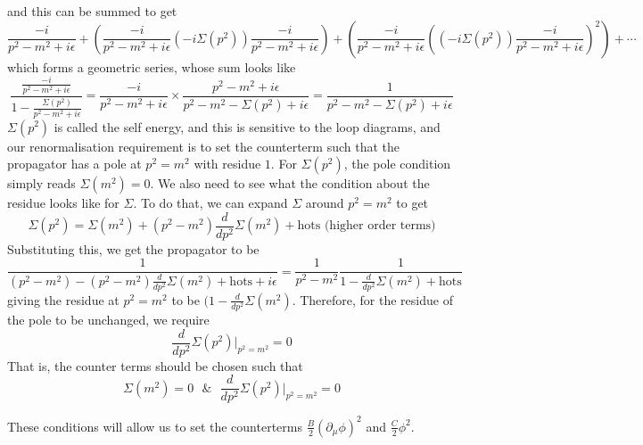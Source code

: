 \documentclass[11pt]{article}
\newcommand{\del}{\partial}
\numberwithin{equation}{section}
\begin{document}
and this can be summed to get 
\begin{equation*}
    \frac{-i}{p^2 - m^2 + i\epsilon} + \left( \frac{-i}{p^2 - m^2 + i\epsilon}(-i\Sigma(p^2))\frac{-i}{p^2 - m^2 + i\epsilon}\right) + \left(\frac{-i}{p^2 - m^2 + i\epsilon}\left((-i\Sigma(p^2))\frac{-i}{p^2 - m^2 + i\epsilon}\right)^2 \right) + \cdots
\end{equation*}
which forms a geometric series, whose sum looks like 
\begin{equation*}
    \displaystyle \frac{\displaystyle \frac{-i}{p^2 - m^2 + i\epsilon}}{\displaystyle 1 - \frac{\Sigma(p^2)}{p^2 - m^2 + i\epsilon}} = \frac{-i}{p^2 - m^2 + i\epsilon} \times \frac{p^2 - m^2 + i\epsilon}{p^2 - m^2 - \Sigma(p^2) + i\epsilon} = \frac{1}{p^2 - m^2 - \Sigma(p^2) + i\epsilon}
\end{equation*}
\(\Sigma(p^2)\) is called the self energy, and this is sensitive to the loop diagrams, and our renormalisation requirement is to set the counterterm such that the propagator has a pole at \(p^2 = m^2\) with residue \(1\). For \(\Sigma(p^2)\), the pole condition simply reads \(\Sigma(m^2) = 0\). We also need to see what the condition about the residue looks like for \(\Sigma\). To do that, we can expand \(\Sigma\) around \(p^2 = m^2\) to get  
\begin{equation*}
    \Sigma(p^2) = \Sigma(m^2) + (p^2 - m^2)\frac{d}{dp^2}\Sigma(m^2) + \text{hots (higher order terms)}
\end{equation*}
Substituting this, we get the propagator to be
\begin{equation*}
    \frac{1}{\displaystyle(p^2 - m^2) - (p^2 - m^2)\frac{d}{dp^2}\Sigma(m^2) + \text{hots} + i\epsilon} = \frac{1}{p^2 - m^2}\frac{1}{\displaystyle 1-\frac{d}{dp^2}\Sigma(m^2) + \text{hots}}
\end{equation*}
giving the residue at \(p^2 = m^2\) to be \((\displaystyle 1-\frac{d}{dp^2}\Sigma(m^2)\). Therefore, for the residue of the pole to be unchanged, we require 
\begin{equation*}
    \frac{d}{dp^2}\Sigma(p^2)\bigg|_{p^2 = m^2} = 0
\end{equation*}
That is, the counter terms should be chosen such that 
\begin{equation*}
    \Sigma(m^2) = 0 ~~~\&~~~ \frac{d}{dp^2}\Sigma(p^2)\bigg|_{p^2 = m^2} = 0
\end{equation*}
\vspace{10pt}

These conditions will allow us to set the counterterms \(\displaystyle \frac{B}{2}(\del_\mu\phi)^2\) and \(\displaystyle \frac{C}{2}\phi^2\).\\
\end{document}

